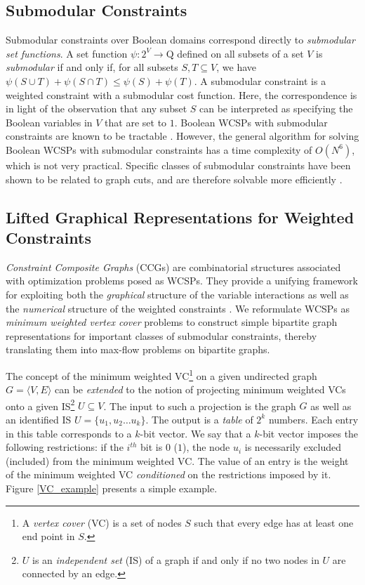 \subsection{Submodular Constraints}
  Submodular constraints over Boolean domains correspond directly to \emph{submodular set functions}. A set function $\psi : 2^V \rightarrow \mathrm{Q}$ defined on all subsets of a set $V$ is \emph{submodular} if and only if, for all subsets $S, T \subseteq V$, we have $\psi(S \cup T) + \psi(S \cap T) \leq \psi(S) + \psi(T)$. A submodular constraint is a weighted constraint with a submodular cost function. Here, the correspondence is in light of the observation that any subset $S$ can be interpreted as specifying the Boolean variables in $V$ that are set to $1$. Boolean WCSPs with submodular constraints are known to be tractable \cite{ZSH:CSC:10}. However, the general algorithm for solving Boolean WCSPs with submodular constraints has a time complexity of $O(N^6)$, which is not very practical. Specific classes of submodular constraints have been shown to be related to graph cuts, and are therefore solvable more efficiently \cite{ZSH:CSC:10}.

\subsection{Lifted Graphical Representations for Weighted Constraints}
  \emph{Constraint Composite Graphs} (CCGs) are combinatorial structures associated with optimization problems posed as WCSPs. They provide a unifying framework for exploiting both the \emph{graphical} structure of the variable interactions as well as the \emph{numerical} structure of the weighted constraints \cite{K:CP:08}. We reformulate WCSPs as \emph{minimum weighted vertex cover} problems to construct simple bipartite graph representations for important classes of submodular constraints, thereby translating them into max-flow problems on bipartite graphs.

  The concept of the minimum weighted VC\footnote{A \emph{vertex cover} (VC) is a set of nodes $S$ such that every edge has at least one end point in $S$.} on a given undirected graph $G=\langle V,E \rangle$ can be \emph{extended} to the notion of projecting minimum weighted VCs onto a given IS\footnote{$U$ is an \emph{independent set} (IS) of a graph if and only if no two nodes in $U$ are connected by an edge.} $U \subseteq V$. The input to such a projection is the graph $G$ as well as an identified IS $U=\{u_1, u_2 \ldots u_k\}$. The output is a \emph{table} of $2^k$ numbers. Each entry in this table corresponds to a $k$-bit vector. We say that a $k$-bit vector imposes the following restrictions: if the $i^{th}$ bit is $0$ ($1$), the node $u_i$ is necessarily excluded (included) from the minimum weighted VC. The value of an entry is the weight of the minimum weighted VC \emph{conditioned} on the restrictions imposed by it. Figure \ref{VC_example} presents a simple example.
  
